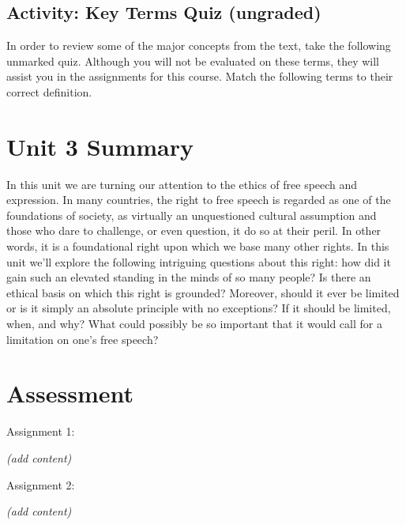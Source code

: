 \documentclass[
]{book}
\begin{document}
\hypertarget{activity-key-terms-quiz-ungraded-1}{%
\subsection*{Activity: Key Terms Quiz (ungraded)}\label{activity-key-terms-quiz-ungraded-1}}

\begin{reflect}
In order to review some of the major concepts from the text, take the following unmarked quiz. Although you will not be evaluated on these terms, they will assist you in the assignments for this course. Match the following terms to their correct definition.
\end{reflect}

\hypertarget{unit-3-summary}{%
\section*{Unit 3 Summary}\label{unit-3-summary}}

In this unit we are turning our attention to the ethics of free speech and expression. In many countries, the right to free speech is regarded as one of the foundations of society, as virtually an unquestioned cultural assumption and those who dare to challenge, or even question, it do so at their peril. In other words, it is a foundational right upon which we base many other rights. In this unit we'll explore the following intriguing questions about this right: how did it gain such an elevated standing in the minds of so many people? Is there an ethical basis on which this right is grounded? Moreover, should it ever be limited or is it simply an absolute principle with no exceptions? If it should be limited, when, and why? What could possibly be so important that it would call for a limitation on one's free speech?

\hypertarget{assessment-5}{%
\section*{Assessment}\label{assessment-5}}

\begin{assessment}
{Assignment 1:}

\emph{(add content)}

{Assignment 2:}

\emph{(add content)}
\end{assessment}
\end{document}
